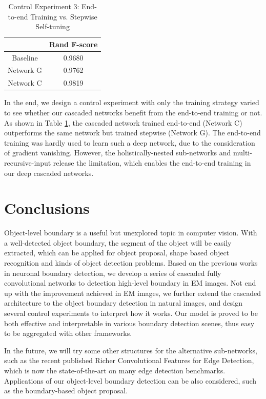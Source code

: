 \documentclass[senior]{IPSstyle}
\begin{document}
\begin{table}[t]
\renewcommand{\arraystretch}{0.6}
\caption{Control Experiment 3: End-to-end Training vs. Stepwise Self-tuning}
\label{outcome}
\begin{center}
\begin{tabular}{|c|c|}
\hline
&\multicolumn{1}{c|}{Rand F-score}\\
\hline
Baseline	 		& 0.9680	\\	\hline
Network G 		& 0.9762	\\	\hline
Network C 		& 0.9819	\\	\hline
\end{tabular}
\end{center}
\label{control_experiment_3}
\end{table}

In the end, we design a control experiment with only the training strategy varied to see whether our cascaded networks benefit from the end-to-end training or not. As shown in Table \ref{control_experiment_3}, the cascaded network trained end-to-end (Network C) outperforms the same network but trained stepwise (Network G). The end-to-end training was hardly used to learn such a deep network, due to the consideration of gradient vanishing. However, the holistically-nested sub-networks and multi-recursive-input release the limitation, which enables the end-to-end training in our deep cascaded networks. 

\chapter{Conclusions} \label{conclusions}

Object-level boundary is a useful but unexplored topic in computer vision. With a well-detected object boundary, the segment of the object will be easily extracted, which can be applied for object proposal, shape based object recognition and  kinds of object detection problems. Based on the previous works in neuronal boundary detection, we develop a series of cascaded fully convolutional networks to detection high-level boundary in EM images. Not end up with the improvement achieved in EM images, we further extend the cascaded architecture to the object boundary detection in natural images, and design several control experiments to interpret how it works. Our model is proved to be both effective and interpretable in various boundary detection scenes, thus easy to be aggregated with other frameworks.

In the future, we will try some other structures for the alternative sub-networks, such as the recent published Richer Convolutional Features for Edge Detection\cite{Liu2017}, which is now the state-of-the-art on many edge detection benchmarks. Applications of our object-level boundary detection can be also considered, such as the boundary-based object proposal\cite{Yang2016}. 









\end{document}
